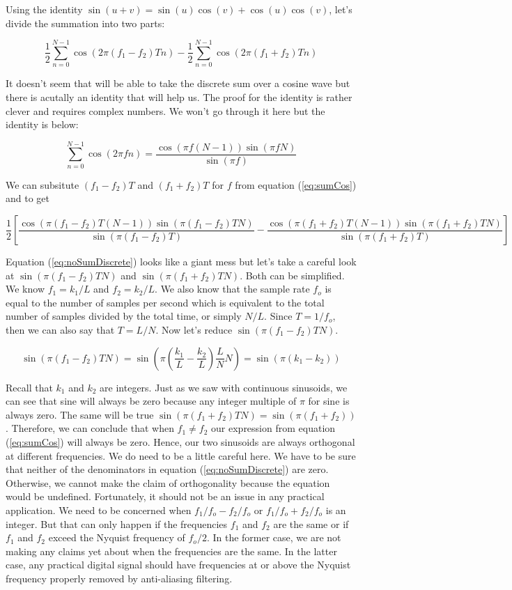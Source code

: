 	Using the identity $\sin(u + v) = \sin(u)\cos(v) + \cos(u)\cos(v)$, let's divide the summation into two parts:
	
	$$\frac{1}{2}\sum_{n = 0}^{N-1}\cos(2\pi (f_1 - f_2)Tn) - \frac{1}{2}\sum_{n = 0}^{N-1}\cos(2\pi (f_1 + f_2)Tn)$$
	
	It doesn't seem that will be able to take the discrete sum over a cosine wave but there is acutally an identity that
	will help us.  The proof for the identity is rather clever and requires complex numbers.  We won't go through it here
	but the identity is below:
	
	\begin{equation}
		\label{eq:sumCos}
		\sum_{n=0}^{N - 1}\cos(2\pi fn) = \frac{\cos(\pi f(N - 1))\sin(\pi fN)}{\sin(\pi f)}
	\end{equation}
	
	We can subsitute $(f_1 - f_2)T$ and $(f_1 + f_2)T$ for $f$ from equation (\ref{eq:sumCos}) and to get
	
	\begin{equation}
	\label{eq:noSumDiscrete}
	\frac{1}{2}\left[ \frac{\cos(\pi (f_1 - f_2)T(N - 1))\sin(\pi (f_1 - f_2)TN)}{\sin(\pi (f_1 - f_2)T)} - \frac{\cos(\pi (f_1 + f_2)T(N - 1))\sin(\pi (f_1 + f_2)TN)}{\sin(\pi (f_1 + f_2)T)}\right]
	\end{equation}
	
	Equation (\ref{eq:noSumDiscrete}) looks like a giant mess but let's take a careful look at $\sin(\pi (f_1 - f_2)TN)$
	and $\sin(\pi (f_1 + f_2)TN)$.  Both can be simplified.  We know $f_1 = k_1/L$ and $f_2 = k_2/L$.  We also
	know that the sample rate $f_o$ is equal to the number of samples per second which is equivalent to the total
	number of samples divided by the total time, or simply $N/L$.  Since $T = 1/f_o$, then we can also say that 
	$T = L/N$.  Now let's reduce $\sin(\pi (f_1 - f_2)TN)$.
	
	$$\sin(\pi (f_1 - f_2)TN) = \sin(\pi (\frac{k_1}{L} - \frac{k_2}{L})\frac{L}{N}N) = \sin(\pi(k_1 - k_2))$$
	
	Recall that $k_1$ and $k_2$ are integers.  Just as we saw with continuous sinusoids, we can see that sine will 
	always be zero because any integer multiple of $\pi$ for sine is always zero.  The same will be true 
	$\sin(\pi (f_1 + f_2)TN) = \sin(\pi (f_1 + f_2))$.  Therefore, we can conclude that when $f_1 \neq f_2$ our 
	expression from equation (\ref{eq:sumCos}) will always be zero.  Hence, our two sinusoids are always orthogonal
	at different frequencies.  We do need to be a little careful here.  We have to be sure that neither of the
	denominators in equation (\ref{eq:noSumDiscrete}) are zero.  Otherwise, we cannot make the claim of
	orthogonality because the equation would be undefined.  Fortunately, it should not be an issue in any 
	practical application.  We need to be concerned when $f_1/f_o - f_2/f_o$ or $f_1/f_o + f_2/f_o$ is an
	integer.  But that can only happen if the frequencies $f_1$ and $f_2$ are the same or if $f_1$ and $f_2$ 
	exceed the Nyquist frequency of $f_o/2$.  In the former case, we are not making any claims yet about
	when the frequencies are the same.  In the latter case, any practical digital signal should have frequencies
	at or above the Nyquist frequency properly removed by anti-aliasing filtering.  
	
